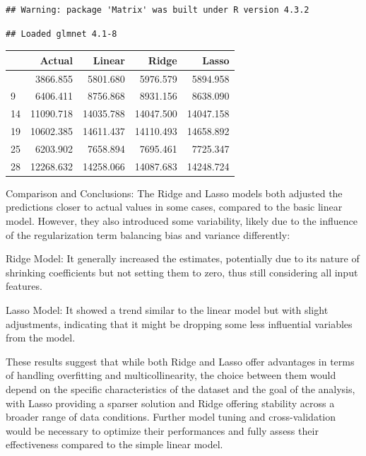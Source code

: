 \documentclass[
  12pt,
]{article}
\begin{document}
\begin{verbatim}
## Warning: package 'Matrix' was built under R version 4.3.2
\end{verbatim}

\begin{verbatim}
## Loaded glmnet 4.1-8
\end{verbatim}

\begin{longtable}[]{@{}lrrrr@{}}
\toprule\noalign{}
& Actual & Linear & Ridge & Lasso \\
\midrule\noalign{}
\endhead
\bottomrule\noalign{}
\endlastfoot
5 & 3866.855 & 5801.680 & 5976.579 & 5894.958 \\
9 & 6406.411 & 8756.868 & 8931.156 & 8638.090 \\
14 & 11090.718 & 14035.788 & 14047.500 & 14047.158 \\
19 & 10602.385 & 14611.437 & 14110.493 & 14658.892 \\
25 & 6203.902 & 7658.894 & 7695.461 & 7725.347 \\
28 & 12268.632 & 14258.066 & 14087.683 & 14248.724 \\
\end{longtable}

Comparison and Conclusions: The Ridge and Lasso models both adjusted the
predictions closer to actual values in some cases, compared to the basic
linear model. However, they also introduced some variability, likely due
to the influence of the regularization term balancing bias and variance
differently:

Ridge Model: It generally increased the estimates, potentially due to
its nature of shrinking coefficients but not setting them to zero, thus
still considering all input features.

Lasso Model: It showed a trend similar to the linear model but with
slight adjustments, indicating that it might be dropping some less
influential variables from the model.

These results suggest that while both Ridge and Lasso offer advantages
in terms of handling overfitting and multicollinearity, the choice
between them would depend on the specific characteristics of the dataset
and the goal of the analysis, with Lasso providing a sparser solution
and Ridge offering stability across a broader range of data conditions.
Further model tuning and cross-validation would be necessary to optimize
their performances and fully assess their effectiveness compared to the
simple linear model.
\end{document}
